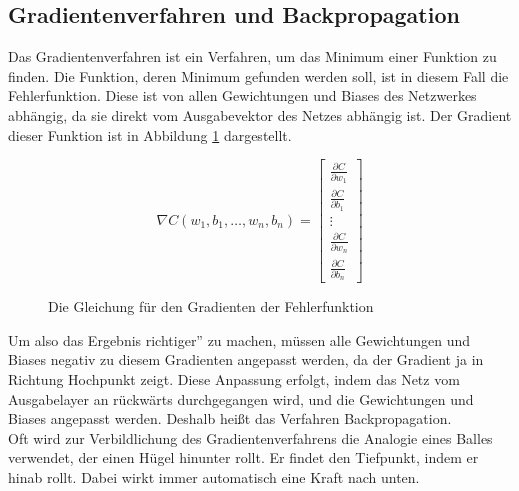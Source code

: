 \documentclass[11pt]{article}
\begin{document}
\subsection{Gradientenverfahren und Backpropagation}
\label{Gradient_section}
Das Gradientenverfahren ist ein Verfahren, um das Minimum einer Funktion zu finden. Die Funktion, deren Minimum gefunden werden soll, ist in diesem Fall die Fehlerfunktion. Diese ist von allen Gewichtungen und Biases des Netzwerkes abhängig, da sie direkt vom Ausgabevektor des Netzes abhängig ist. Der Gradient dieser Funktion ist in Abbildung \ref{Gradient_Function} dargestellt.
\newpage
\begin{figure}[h]
	\begin{equation*}
	\nabla C(w_1,b_1,\ldots,w_n,b_n)=
	\begin{bmatrix}
		\frac{\partial C}{\partial w_1}\\
		\frac{\partial C}{\partial b_1}\\
		\vdots\\
		\frac{\partial C}{\partial w_n}\\
		\frac{\partial C}{\partial b_n}
	\end{bmatrix}
	\end{equation*}
	\caption{Die Gleichung für den Gradienten der Fehlerfunktion}
	\label{Gradient_Function}
\end{figure}
Um also das Ergebnis \glqq richtiger'' zu machen, müssen alle Gewichtungen und Biases negativ zu diesem Gradienten angepasst werden, da der Gradient ja in Richtung Hochpunkt zeigt. Diese Anpassung erfolgt, indem das Netz vom Ausgabelayer an rückwärts durchgegangen wird, und die Gewichtungen und Biases angepasst werden. Deshalb heißt das Verfahren Backpropagation.\\
Oft wird zur Verbildlichung des Gradientenverfahrens die Analogie eines Balles verwendet, der einen Hügel hinunter rollt. Er findet den Tiefpunkt, indem er hinab rollt. Dabei wirkt immer automatisch eine Kraft nach unten.
\end{document}
